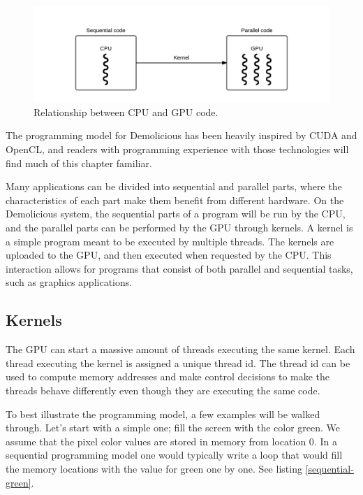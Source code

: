 \documentclass[../main/report.tex]{subfiles}
\begin{document}
\begin{figure}[H]
	\centering
	\includegraphics[width=\textwidth]{../system_overview/diagrams/programming_model_cpu_gpu.png}
	\caption{Relationship between CPU and GPU code.}
	\label{fig:programming_model_cpu_gpu}
\end{figure}

The programming model for Demolicious has been heavily inspired by CUDA and OpenCL, 
and readers with programming experience with those technologies will find much of this chapter familiar.

Many applications can be divided into sequential and parallel parts,
where the characteristics of each part make them benefit from different hardware.
On the Demolicious system, the sequential parts of a program will be run by the CPU, and the parallel parts can be performed by the GPU through kernels.
A kernel is a simple program meant to be executed by multiple threads.
The kernels are uploaded to the GPU, and then executed when requested by the CPU.
This interaction allows for programs that consist of both parallel and sequential tasks, such as graphics applications.

\subsection{Kernels}
The GPU can start a massive amount of threads executing the same kernel.
Each thread executing the kernel is assigned a unique thread id.
The thread id can be used to compute memory addresses and make control decisions
to make the threads behave differently even though they are executing the same code. 


To best illustrate the programming model, a few examples will be walked through. 
Let's start with a simple one; fill the screen with the color green.
We assume that the pixel color values are stored in memory from location 0.
In a sequential programming model one would typically write a loop that would fill
the memory locations with the value for green one by one. 
See listing \ref{sequential-green}.
\end{document}
